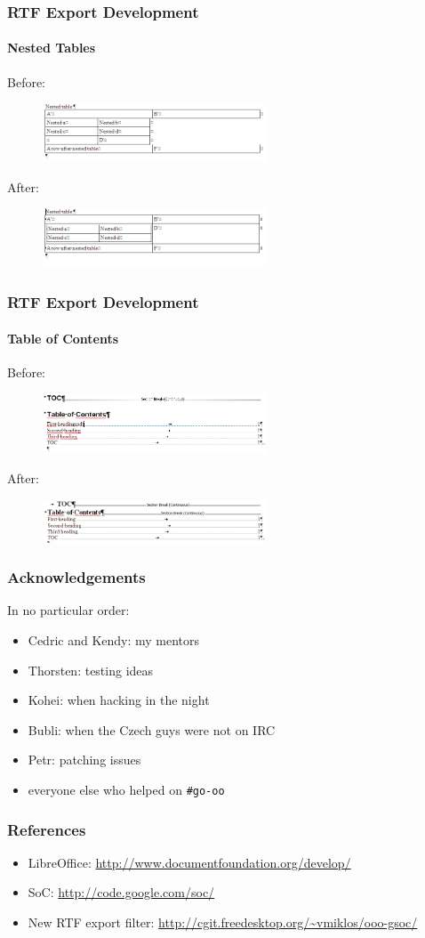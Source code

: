 \documentclass[hyperref={pdfpagelabels=false}]{beamer}
\begin{document}
\begin{frame}
\frametitle{RTF Export Development}
\framesubtitle{Nested Tables}
Before:
\begin{figure}[H]
\includegraphics[width=250px,keepaspectratio]{pic/table-nested-old.png}
\end{figure}
After:
\begin{figure}[H]
\includegraphics[width=250px,keepaspectratio]{pic/table-nested-new.png}
\end{figure}
\end{frame}

\begin{frame}
\frametitle{RTF Export Development}
\framesubtitle{Table of Contents}
Before:
\begin{figure}[H]
\includegraphics[width=250px,keepaspectratio]{pic/toc-old.png}
\end{figure}
After:
\begin{figure}[H]
\includegraphics[width=250px,keepaspectratio]{pic/toc-new.png}
\end{figure}
\end{frame}

\begin{frame}
\frametitle{Acknowledgements}
In no particular order:
\begin{itemize}
\item Cedric and Kendy: my mentors
\item Thorsten: testing ideas
\item Kohei: when hacking in the night
\item Bubli: when the Czech guys were not on IRC
\item Petr: patching issues
\item everyone else who helped on \texttt{\#go-oo}
\end{itemize}
\end{frame}

\begin{frame}
\frametitle{References}
\begin{itemize}
\item LibreOffice: \url{http://www.documentfoundation.org/develop/}
\item SoC: \url{http://code.google.com/soc/}
\item New RTF export filter: \url{http://cgit.freedesktop.org/~vmiklos/ooo-gsoc/}
\end{itemize}
\end{frame}
\end{document}
